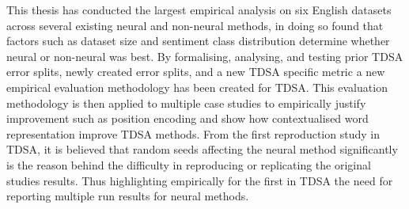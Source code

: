 This thesis has conducted the largest empirical analysis on six English datasets across several existing neural and non-neural methods, in doing so found that factors such as dataset size and sentiment class distribution determine whether neural or non-neural was best. By formalising, analysing, and testing prior TDSA error splits, newly created error splits, and a new TDSA specific metric a new empirical evaluation methodology has been created for TDSA. This evaluation methodology is then applied to multiple case studies to empirically justify improvement such as position encoding and show how contextualised word representation improve TDSA methods. From the first reproduction study in TDSA, it is believed that random seeds affecting the neural method significantly is the reason behind the difficulty in reproducing or replicating the original studies results. Thus highlighting empirically for the first in TDSA the need for reporting multiple run results for neural methods.







